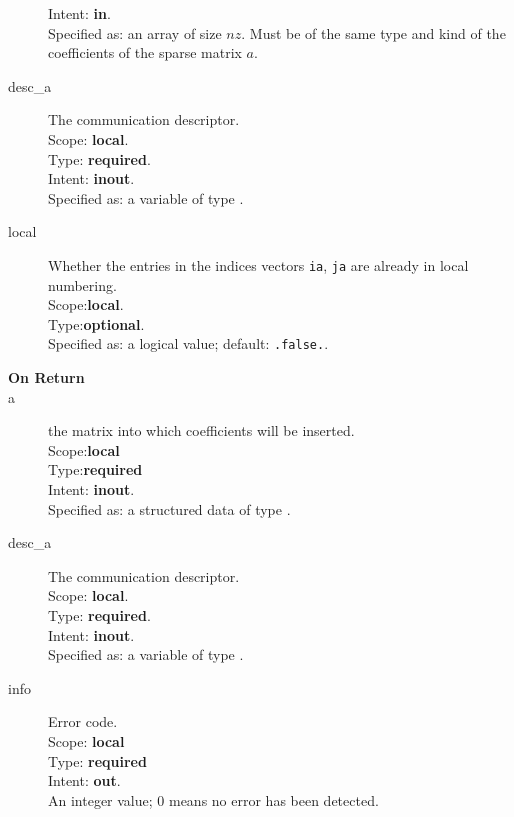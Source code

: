 \begin{description}
Intent: {\bf in}.\\
Specified as: an array of size $nz$. Must be of the same type and kind
of the coefficients  of the sparse matrix $a$.
\item[desc\_a] The communication descriptor.\\
Scope: {\bf local}. \\
Type: {\bf required}.\\
Intent: {\bf inout}.\\
Specified as: a variable of type \descdata.\\
\item[local] Whether the entries in the indices vectors \verb|ia|,
  \verb|ja| are already in local  numbering. \\
 Scope:{\bf local}.\\
 Type:{\bf optional}.\\
 Specified as: a logical value; default: \verb|.false.|.

\end{description}

\begin{description}
\item[\bf On Return]
\item[a] the matrix into which coefficients will be inserted.\\
Scope:{\bf local}\\
Type:{\bf required}\\
Intent: {\bf inout}.\\
Specified as: a structured data of type \spdata.
\item[desc\_a] The communication descriptor.\\
Scope: {\bf local}. \\
Type: {\bf required}.\\
Intent: {\bf inout}.\\
Specified as: a variable of type \descdata.\\
\item[info] Error code.\\
Scope: {\bf local} \\
Type: {\bf required} \\
Intent: {\bf out}.\\
An integer value; 0 means no error has been detected. 
\end{description}

